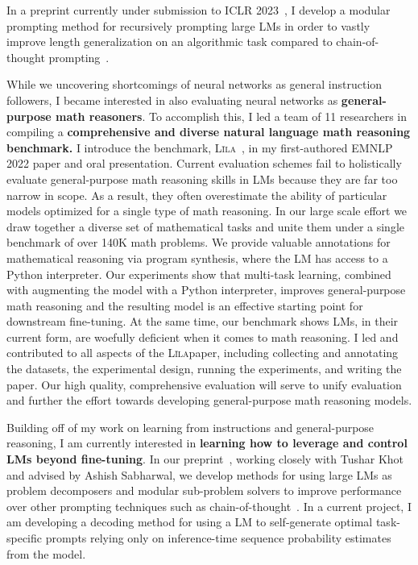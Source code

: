 \documentclass[12pt]{article}
\newcommand\lila{\textsc{L\={\i}la}}
\begin{document}
In a preprint currently under submission to ICLR 2023~\cite{Khot2022DecomposedPA},
I develop a modular prompting method for recursively prompting large LMs 
in order to vastly improve length generalization on an algorithmic task
compared to chain-of-thought prompting~\cite{}.

While we uncovering shortcomings of neural networks 
as general instruction followers,
I became interested in also evaluating neural networks as 
\textbf{general-purpose math reasoners}.
To accomplish this,
I led a team of 11 researchers in compiling a
\textbf{comprehensive and diverse natural language math reasoning benchmark.} 
I introduce the benchmark, \lila~\cite{Mishra2022Lila}, 
in my first-authored EMNLP 2022 paper and oral presentation.
Current evaluation schemes fail to holistically evaluate 
general-purpose math reasoning skills in LMs
because they are far too narrow in scope. 
As a result, they often overestimate the ability 
of particular models optimized for a single type of math reasoning.
In our large scale effort we draw together a diverse set of mathematical tasks 
and unite them under a single benchmark of over 140K math problems.
We provide valuable annotations for mathematical reasoning via program synthesis, 
where the LM has access to a Python interpreter.
Our experiments show that multi-task learning, 
combined with augmenting the model with a Python interpreter,
improves general-purpose math reasoning
and the resulting model is an effective starting point 
for downstream fine-tuning. 
At the same time, our benchmark shows LMs, 
in their current form, 
are woefully deficient when it comes to math reasoning.
I led and contributed to all aspects of the \lila paper,
including collecting and annotating the datasets,
the experimental design, running the experiments, and writing the paper.
Our high quality, comprehensive evaluation  
will serve to unify evaluation
and further the effort towards developing general-purpose math reasoning models.

Building off of my work 
on learning from instructions and general-purpose reasoning, 
I am currently interested in
\textbf{learning how to leverage and control LMs beyond fine-tuning}.
In our preprint~\cite{Khot2022DecomposedPA}, working closely with Tushar Khot and advised by Ashish Sabharwal, we develop methods for using large LMs 
as problem decomposers and modular sub-problem solvers to improve performance over 
other prompting techniques such as chain-of-thought~\cite{}. 
In a current project, 
I am developing a decoding method for using a LM 
to self-generate optimal task-specific prompts 
relying only on inference-time sequence probability estimates from the model.
\end{document}
